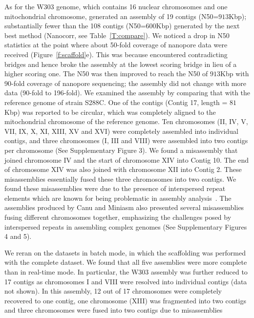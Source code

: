 As for the \sce{} W303 genome, which contains 16 nuclear chromosomes and one 
mitochondrial chromosome, \npscarf{} generated an assembly of 19 contigs (N50=$913$Kbp); 
substantially fewer than 
the 108 contigs (N50=$600$Kbp) generated by the next best method (Nanocorr, 
see Table~\ref{T:compare}).
We noticed a drop in N50 statistics at the point where about 50-fold coverage 
of nanopore data were received (Figure~\ref{f:scaffold}e). This was because
\npscarf{} encountered contradicting bridges and hence broke the assembly at 
the lowest scoring bridge in lieu of a higher scoring one. The N50 was then 
improved to reach the N50 of $913$Kbp with 90-fold coverage of nanopore sequencing; 
the assembly did not change with more data (90-fold to 196-fold). 
We examined the assembly by comparing that with the reference genome of \sce{}
strain S288C. One of the contigs (Contig 17,
length = $81$Kbp) was reported to be circular, which was completely aligned to the 
mitochondrial chromosome of the reference genome. Ten chromosomes (II,
IV, V, VII, IX, X, XI, XIII, XV and XVI) were completely assembled into individual
contigs, and three chromosomes (I, III and VIII) were assembled into two contigs per 
chromosome (See Supplementary Figure 3). We found a misassembly that joined
chromosome IV and the start of chromosome XIV into Contig 10. The end of
chromosome XIV was also joined with chromosome XII into Contig 2. These
misassemblies essentially fused these three chromosomes into two contigs.
We found these misassemblies were due to the presence of interspersed repeat
elements which are known for being problematic in assembly
analysis~\cite{TreangenS2012}. The assemblies produced by Canu and Miniasm also
presented several misassemblies fusing different chromosomes together, 
emphasizing the challenges posed by interspersed repeats in assembling complex 
genomes (See Supplementary Figures 4 and 5).


We reran \npscarf{} on the datasets in batch mode, in which the scaffolding was
performed with the complete dataset. We found that all five assemblies were  
more complete than in real-time mode. In particular, the \sce{} W303
assembly was further reduced to 17 contigs as chromosomes I and VIII were 
resolved into individual contigs (data not shown). In this assembly, 12 out of
17 chromosomes were completely recovered to one contig, one chromosome (XIII)
was fragmented into two contigs and three chromosomes were fused into two
contigs due to misassemblies


